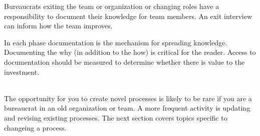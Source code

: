 Bureaucrats exiting the team or organization or changing roles have a responsibility to document their knowledge for team members. An exit interview can inform how the team improves. 

In each phase documentation is the mechanism for spreading knowledge. Documenting the why (in addition to the how) is critical for the reader. Access to documentation should be measured to determine whether there is value to the investment. 


\noindent\hrulefill

\ \\

The opportunity for you to create novel processes is likely to be rare if you are a bureaucrat in an old organization or team. A more frequent activity is updating and revising existing processes. The next section covers topics specific to changeing a process.